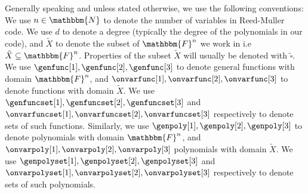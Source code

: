 \documentclass[10pt,a4paper]{article}
\newcommand{\basefield}[0]{\mathbbm{F}}
\newcommand{\blocklength}[0]{n}
\newcommand{\field}[0]{\basefield^{\blocklength}}
\newcommand{\degree}[0]{d}
\newcommand{\naturalnumbersset}[0]{\mathbbm{N}}
\newcommand{\variety}{{\tilde{X}}}
\begin{document}
Generally speaking and unless stated otherwise, we use the following conventions:
We use $\blocklength \in \naturalnumbersset$ to denote the number of variables in Reed-Muller code.
We use $\degree$ to denote a degree (typically the degree of the polynomials in our code), and $\variety$ to denote the subset of $\field$ we work in i.e $\variety \subseteq \field$.
Properties of the subset $\variety$ will usually be denoted with $\tilde{\square}$.
We use $\genfunc[1], \genfunc[2], \genfunc[3]$ to denote general functions with domain $\field$, and $\onvarfunc[1], \onvarfunc[2], \onvarfunc[3]$ to denote functions with domain $\variety$.
We use $\genfuncset[1], \genfuncset[2], \genfuncset[3]$ and $\onvarfuncset[1], \onvarfuncset[2], \onvarfuncset[3]$ respectively to denote sets of such functions.
Similarly, we use $\genpoly[1], \genpoly[2], \genpoly[3]$ to denote polynomials with domain $\field$, and $\onvarpoly[1], \onvarpoly[2], \onvarpoly[3]$ polynomials with domain $\variety$.
We use $\genpolyset[1], \genpolyset[2], \genpolyset[3]$ and $\onvarpolyset[1], \onvarpolyset[2], \onvarpolyset[3]$ respectively to denote sets of such polynomials.
\end{document}
